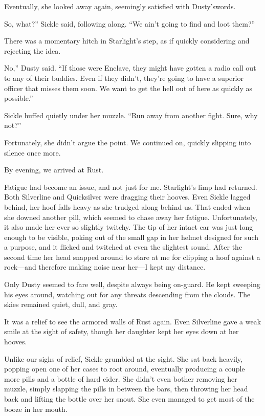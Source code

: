 Eventually, she looked away again, seemingly satisfied with Dusty’s\linebreak[1] words.

\leavevmode{}So, what?” Sickle said, following along. “We ain’t going to find and loot them?”

There was a momentary hitch in Starlight’s step, as if quickly considering and rejecting the idea.

\leavevmode{}No,” Dusty said. “If those were Enclave, they might have gotten a radio call out to any of their buddies. Even if they didn’t, they’re going to have a superior officer that misses them soon. We want to get the hell out of here as quickly as possible.”

Sickle huffed quietly under her muzzle. “Run away from another fight. Sure, why not?”

Fortunately, she didn’t argue the point. We continued on, quickly slipping into silence once more.

{\br}%
By evening, we arrived at Rust.

Fatigue had become an issue, and not just for me. Starlight’s limp had returned. Both Silverline and Quicksilver were dragging their hooves. Even Sickle lagged behind, her hoof-falls heavy as she trudged along behind us. That ended when she downed another pill, which seemed to chase away her fatigue. Unfortunately, it also made her ever so slightly twitchy. The tip of her intact ear was just long enough to be visible, poking out of the small gap in her helmet designed for such a purpose, and it flicked and twitched at even the slightest sound. After the second time her head snapped around to stare at me for clipping a hoof against a rock—and therefore making noise near her—I kept my distance.

Only Dusty seemed to fare well, despite always being on-guard. He kept sweeping his eyes around, watching out for any threats descending from the clouds. The skies remained quiet, dull, and gray.

It was a relief to see the armored walls of Rust again. Even Silverline gave a weak smile at the sight of safety, though her daughter kept her eyes down at her hooves.

Unlike our sighs of relief, Sickle grumbled at the sight. She sat back heavily, popping open one of her cases to root around, eventually producing a couple more pills and a bottle of hard cider. She didn’t even bother removing her muzzle, simply slapping the pills in between the bars, then throwing her head back and lifting the bottle over her snout. She even managed to get most of the booze in her mouth.

